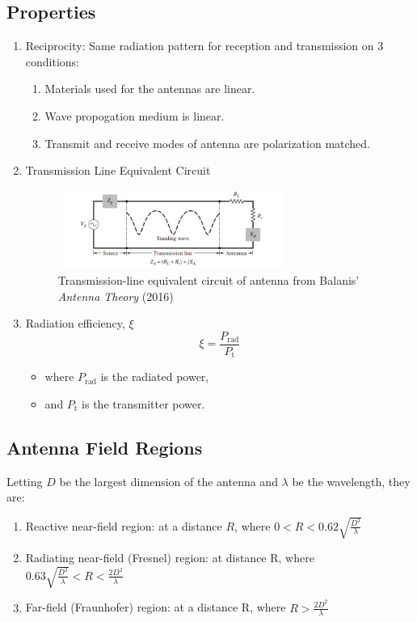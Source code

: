 \documentclass[a4paper]{article}
\begin{document}
\subsection{Properties}
\begin{enumerate}
    \item Reciprocity: Same radiation pattern for reception and transmission on 3 conditions:
    \begin{enumerate}
        \item Materials used for the antennas are linear.
        \item Wave propogation medium is linear.
        \item Transmit and receive modes of antenna are polarization matched.
    \end{enumerate}
    \item Transmission Line Equivalent Circuit
    \begin{figure}[H]
        \centering
        \includegraphics[width=0.7\textwidth]{TL_ant_Tx.png}
        \caption{Transmission-line equivalent circuit of antenna from Balanis' \textit{Antenna Theory} (2016)}
        \label{fig:TLCircTx}
    \end{figure}
    \item Radiation efficiency, $\xi$
    $$\xi = \frac{P_\text{rad}}{P_\text{t}}$$
    \begin{itemize}[label=$\circ$]
        \item where $P_\text{rad}$ is the radiated power,
        \item and $P_\text{t}$ is the transmitter power.
    \end{itemize}
\end{enumerate}

\subsection{Antenna Field Regions}
Letting $D$ be the largest dimension of the antenna and $\lambda$ be the wavelength, they are:
\begin{enumerate}
    \item Reactive near-field region: at a distance $R$, where $0<R<0.62\sqrt{\displaystyle\frac{D^3}{\lambda}}$
    \item Radiating near-field (Fresnel) region: at distance R, where $0.63\sqrt{\displaystyle\frac{D^3}{\lambda}}<R<\displaystyle\frac{2D^2}{\lambda}$
    \item Far-field (Fraunhofer) region: at a distance R, where $R>\displaystyle\frac{2D^2}{\lambda}$
\end{enumerate}
\end{document}
